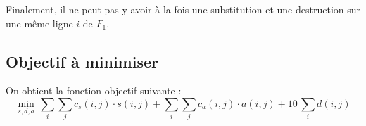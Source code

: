 \documentclass[a4paper, 10pt, french]{article}
\begin{document}
\noindent Finalement, il ne peut pas y avoir à la fois une substitution et une destruction sur une même ligne $i$ de $F_1$.
\\

\subsection*{Objectif à minimiser}

On obtient la fonction objectif suivante :
\begin{equation*}
\min_{s, d, a} \, \sum\limits_i \sum\limits_j c_s(i, j) \cdot s(i, j) + \sum\limits_i \sum\limits_j c_a(i, j) \cdot a(i, j) + 10 \, \sum\limits_i d(i, j)
\end{equation*}





\end{document}
